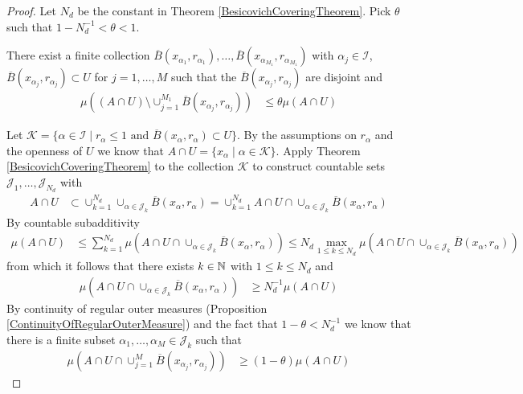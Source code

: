 \begin{proof}
Let $N_d$ be the constant in Theorem \ref{BesicovichCoveringTheorem}.  Pick $\theta$ such that $1 - N_d^{-1} < \theta < 1$.  
\begin{clm}There exist a finite collection $\overline{B}(x_{\alpha_1}, r_{\alpha_1}), \dotsc, \overline{B}(x_{\alpha_{M_1}}, r_{\alpha_{M_1}})$ with $\alpha_j \in \mathcal{I}$,
$\overline{B}(x_{\alpha_j}, r_{\alpha_j}) \subset U$ for $j=1, \dotsc, M$ such that the $\overline{B}(x_{\alpha_j}, r_{\alpha_j})$ are disjoint and 
\begin{align*}
\mu \left( (A \cap U) \setminus \cup_{j=1}^{M_1} \overline{B}(x_{\alpha_j}, r_{\alpha_j}) \right) &\leq \theta \mu(A \cap U)
\end{align*}
\end{clm}
Let $\mathcal{K} = \lbrace \alpha \in \mathcal{I} \mid r_\alpha \leq 1 \text{ and } \overline{B}(x_\alpha, r_\alpha) \subset U \rbrace$.  
By the assumptions on $r_\alpha$ and the openness of $U$ we know that $A \cap U = \lbrace x_\alpha \mid \alpha \in \mathcal{K} \rbrace$.  Apply Theorem \ref{BesicovichCoveringTheorem}
to the collection $\mathcal{K}$ to construct countable sets $\mathcal{J}_1, \dotsc, \mathcal{J}_{N_d}$ with 
\begin{align*}
A \cap U &\subset \cup_{k=1}^{N_d} \cup_{\alpha \in \mathcal{J}_k} \overline{B}(x_\alpha, r_\alpha) = \cup_{k=1}^{N_d} A \cap U \cap \cup_{\alpha \in \mathcal{J}_k} \overline{B}(x_\alpha, r_\alpha) 
\end{align*}
By countable subadditivity
\begin{align*}
\mu(A \cap U) &\leq \sum_{k=1}^{N_d}\mu \left( A \cap U \cap \cup_{\alpha \in \mathcal{J}_k} \overline{B}(x_\alpha, r_\alpha)  \right) 
\leq N_d \max_{1 \leq k \leq N_d} \mu \left( A \cap U \cap \cup_{\alpha \in \mathcal{J}_k} \overline{B}(x_\alpha, r_\alpha)  \right)
\end{align*}
from which it follows that there exists $k \in \mathbb{N}$ with $1 \leq k \leq N_d$ and
\begin{align*}
\mu \left( A \cap U \cap \cup_{\alpha \in \mathcal{J}_k} \overline{B}(x_\alpha, r_\alpha)  \right) &\geq N_d^{-1} \mu(A \cap U)
\end{align*}
By continuity of regular outer measures (Proposition \ref{ContinuityOfRegularOuterMeasure}) and the fact that $1 - \theta < N_d^{-1}$ we know that there is a finite subset $\alpha_1, \dotsc, \alpha_M \in \mathcal{J}_k$ such that
\begin{align*}
\mu \left( A \cap U \cap \cup_{j=1}^M \overline{B}(x_{\alpha_j}, r_{\alpha_j})  \right) &\geq (1 - \theta) \mu(A \cap U)

\end{align*}
\end{proof}
